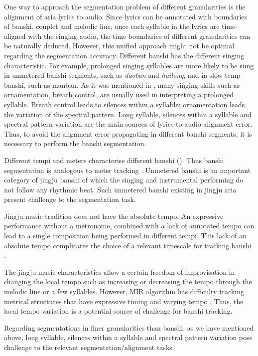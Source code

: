 One way to approach the segmentation problem of different granularities is the alignment of aria lyrics to audio. Since lyrics can be annotated with boundaries of banshi, couplet and melodic line, once each syllable in the lyrics are time-aligned with the singing audio, the time boundaries of different granularities can be naturally deduced. However, this unified approach might not be optimal regarding the segmentation accuracy. Different banshi has the different singing characteristic. For example, prolonged singing syllables are more likely to be sung in unmetered banshi segments, such as \textit{daoban} and \textit{huilong}, and in slow temp banshi, such as manban. As it was mentioned in , many singing skills such as ornamentation, breath control, are usually used in interpreting a prolonged syllable. Breath control leads to silences within a syllable; ornamentation leads the variation of the spectral pattern. Long syllable, silences within a syllable and spectral pattern variation are the main sources of lyrics-to-audio alignment error. Thus, to avoid the alignment error propagating in different banshi segments, it is necessary to perform the banshi segmentation.

Different tempi and meters characterise different banshi (). Thus banshi segmentation is analogous to meter tracking \cite{Srinivasamurthy2016}. Unmetered banshi is an important category of jingju banshi of which the singing and instrumental performing do not follow any rhythmic beat. Such unmetered banshi existing in jingju aria present challenge to the segmentation task.

Jingju music tradition does not have the absolute tempo. An expressive performance without a metronome, combined with a lack of annotated tempo can lead to a single composition being performed in different tempi. This lack of an absolute tempo complicates the choice of a relevant timescale for tracking banshi \cite{Srinivasamurthy2016}.

The jingju music characteristics allow a certain freedom of improvisation in changing the local tempo such as increasing or decreasing the tempo through the melodic line or a few syllables. However, MIR algorithm has difficulty tracking metrical structures that have expressive timing and varying tempo \cite{Holzapfel2012a}. Thus, the local tempo variation is a potential source of challenge for banshi tracking.

Regarding segmentations in finer granularities than banshi, as we have mentioned above, long syllable, silences within a syllable and spectral pattern variation pose challenge to the relevant segmentation/alignment tasks. 

